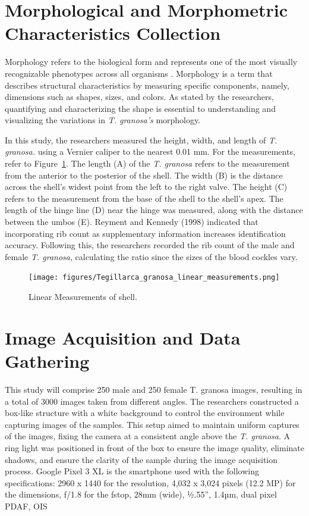\newpage
\section{Morphological and Morphometric Characteristics Collection}
\label{sec:morphochar}

Morphology refers to the biological form and represents one of the most visually recognizable phenotypes across all organisms \cite{tsutsumi2023}. Morphology is a term that describes structural characteristics by measuring specific components, namely, dimensions such as shapes, sizes, and colors. As stated by the researchers, quantifying and characterizing the shape is essential to understanding and visualizing the variations in \textit{T. granosa’s} morphology. 

In this study, the researchers measured the height, width, and length of \textit{T. granosa.} using a Vernier caliper to the nearest 0.01 mm. For the measurements, refer to Figure~\ref{fig:linear_measurements}. The length (A) of the \textit{T. granosa} refers to the measurement from the anterior to the posterior of the shell. The width (B) is the distance across the shell’s widest point from the left to the right valve. The height (C) refers to the measurement from the base of the shell to the shell’s apex. The length of the hinge line (D) near the hinge was measured, along with the distance between the umbos (E). 
Reyment and Kennedy (1998) indicated that incorporating rib count as supplementary information increases identification accuracy. Following this, the researchers recorded the rib count of the male and female \textit{T. granosa}, calculating the ratio since the sizes of the blood cockles vary. 

\begin{figure}[!htbp]
	\centering
	\texttt{[image: figures/Tegillarca\_granosa\_linear\_measurements.png]}
	\caption{Linear Measurements of  \Tegillarcagranosa shell.}
	\label{fig:linear_measurements}
\end{figure}

\section{Image Acquisition and Data Gathering}
\label{sec:imageprocess}
This study will comprise 250 male and 250 female T. granosa images, resulting in a total of 3000 images taken from different angles. The researchers constructed a box-like structure with a white background to control the environment while capturing images of the samples. This setup aimed to maintain uniform captures of the images, fixing the camera at a consistent angle above the \textit{T. granosa}. A ring light was positioned in front of the box to ensure the image quality, eliminate shadows, and ensure the clarity of the sample during the image acquisition process. Google Pixel 3 XL is the smartphone used with the following specifications: 2960 x 1440 for the resolution, 4,032 x 3,024 pixels (12.2 MP) for the dimensions, f/1.8 for the fstop, 28mm (wide), ½.55”, 1.4µm, dual pixel PDAF, OIS \cite{concepcion2023}

